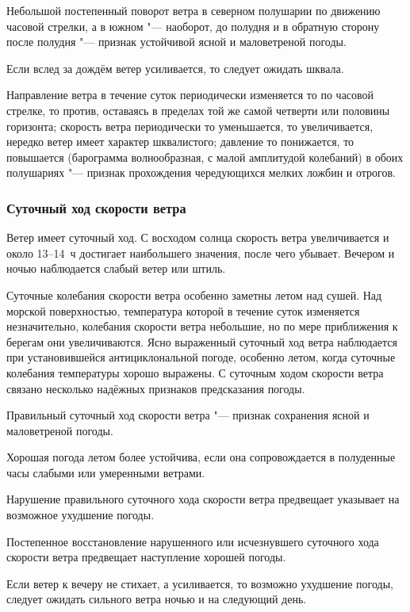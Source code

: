  Небольшой постепенный поворот ветра в северном полушарии по
движению часовой стрелки, а в южном "--- наоборот, до полудня и в обратную
сторону после полудня "--- признак устойчивой ясной и маловетреной погоды.

 Если вслед за дождём ветер усиливается, то следует ожидать шквала.

 Направление ветра в течение суток периодически изменяется то
по часовой стрелке, то против, оставаясь в пределах той же самой
четверти или половины горизонта; скорость ветра периодически то
уменьшается, то увеличивается, нередко ветер имеет характер
шквалистого; давление то понижается, то повышается
(барограмма
волнообразная, с малой амплитудой колебаний) в обоих полушариях "---
признак прохождения чередующихся мелких ложбин и отрогов.

\subsubsection{Суточный ход скорости ветра}

Ветер имеет суточный ход. С восходом солнца скорость ветра
увеличивается и около 13--14~ч достигает наибольшего значения, после
чего убывает. Вечером и ночью наблюдается слабый ветер или штиль.

Суточные колебания скорости ветра особенно заметны летом над
сушей. Над морской поверхностью, температура которой в течение суток
изменяется незначительно, колебания скорости ветра небольшие, но по
мере приближения к берегам они увеличиваются. Ясно выраженный суточный
ход ветра наблюдается при установившейся антициклональной погоде,
особенно летом, когда суточные колебания температуры хорошо
выражены. С суточным ходом скорости ветра связано несколько надёжных
признаков предсказания погоды.

 Правильный суточный ход скорости ветра "--- признак сохранения ясной и маловетреной погоды.

 Хорошая погода летом более устойчива, если она сопровождается
в полуденные часы слабыми или умеренными ветрами.

 Нарушение правильного суточного хода скорости ветра предвещает
указывает на возможное ухудшение погоды.

 Постепенное восстановление нарушенного или исчезнувшего
суточного хода скорости ветра предвещает наступление хорошей погоды.

 Если ветер к вечеру не стихает, а усиливается, то возможно
ухудшение погоды, следует ожидать сильного ветра ночью и на следующий
день.

